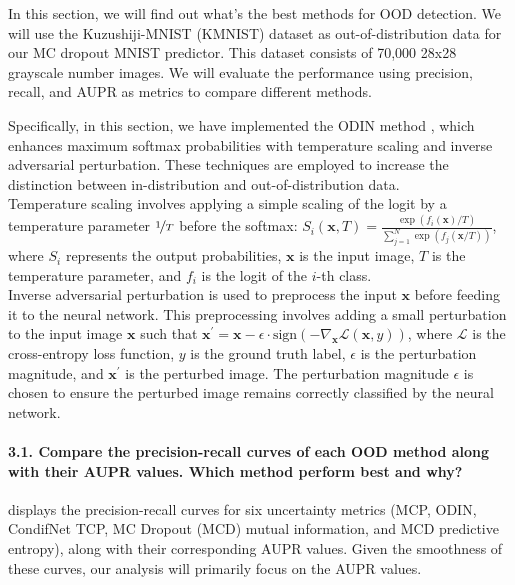 In this section, we will find out what's the best methods for OOD detection. We will use the Kuzushiji-MNIST (KMNIST) dataset as out-of-distribution data for our MC dropout MNIST predictor. This dataset consists of 70,000 28x28 grayscale number images. We will evaluate the performance using precision, recall, and AUPR as metrics to compare different methods.

Specifically, in this section, we have implemented the ODIN method \citep{ODIN}, which enhances maximum softmax probabilities with temperature scaling and inverse adversarial perturbation. These techniques are employed to increase the distinction between in-distribution and out-of-distribution data.\\
Temperature scaling involves applying a simple scaling of the logit by a temperature parameter $ \nicefrac{1}{T} $ before the softmax: $ S_i(\boldsymbol{x}, T) = \frac{\exp (f_i(\boldsymbol{x}) / T)}{\sum_{j=1}^{N} \exp (f_j(\boldsymbol{x} / T))} $, where $ S_i $ represents the output probabilities, $ \boldsymbol{x} $ is the input image, $ T $ is the temperature parameter, and $ f_i $ is the logit of the $ i $-th class.\\
Inverse adversarial perturbation is used to preprocess the input $ \boldsymbol{x} $ before feeding it to the neural network. This preprocessing involves adding a small perturbation to the input image $ \boldsymbol{x} $ such that $ \boldsymbol{x}^\prime = \boldsymbol{x} - \epsilon \cdot \text{sign}(-\nabla_{\boldsymbol{x}} \mathcal{L}(\boldsymbol{x}, y)) $, where $ \mathcal{L} $ is the cross-entropy loss function, $ y $ is the ground truth label, $ \epsilon $ is the perturbation magnitude, and $ \boldsymbol{x}^\prime $ is the perturbed image. The perturbation magnitude $ \epsilon $ is chosen to ensure the perturbed image remains correctly classified by the neural network.

\paragraph*{3.1. Compare the precision-recall curves of each OOD method along with their AUPR values. Which method perform best and why?}
 displays the precision-recall curves for six uncertainty metrics (MCP, ODIN, CondifNet TCP, MC Dropout (MCD) mutual information, and MCD predictive entropy), along with their corresponding AUPR values. Given the smoothness of these curves, our analysis will primarily focus on the AUPR values.

